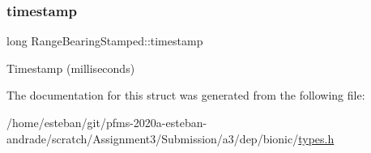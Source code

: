 \subsubsection{\texorpdfstring{timestamp}{timestamp}}
{\footnotesize\ttfamily long Range\+Bearing\+Stamped\+::timestamp}

Timestamp (milliseconds) 

The documentation for this struct was generated from the following file\+:\begin{DoxyCompactItemize}
\item 
/home/esteban/git/pfms-\/2020a-\/esteban-\/andrade/scratch/\+Assignment3/\+Submission/a3/dep/bionic/\hyperlink{bionic_2types_8h}{types.\+h}\end{DoxyCompactItemize}
